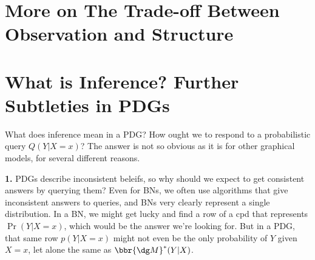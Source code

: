 

\section{More on The Trade-off Between Observation and Structure}
\ifvfull
\section{What is Inference?  Further Subtleties in PDGs}

What does inference mean in a PDG?
How ought we to respond to a probabilistic query $Q(Y|X{=}x)$?
The answer is not so obvious as it is for other graphical models,
for several different reasons.

\textbf{1.}
PDGs describe inconsistent beleifs,
so why should we expect to get consistent answers by querying them?
Even for BNs, we often use algorithms that give inconsistent answers to queries, and BNs very clearly represent a single distribution.
%
In a BN, we might get lucky and find a row of a cpd that represents $\Pr(Y|X{=}x)$, which would be the answer we're looking for.
But in a PDG, that same row  $p(Y | X{=}x)$ might not even be the only probability of $Y$ given $X{=}x$, let alone the same as $\bbr{\dg M}^*(Y|X)$.

